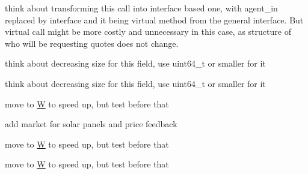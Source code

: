 \begin{DoxyRefList}
\item[\label{_dev_stage2__DevStage2000021}%
\hypertarget{_dev_stage2__DevStage2000021}{}%
Member \hyperlink{classsolar__core_1_1_s_e_i_ad532ca9d30d5988e051b75e33ce6c241}{solar\+\_\+core\+:\+:S\+E\+I\+:\+:form\+\_\+online\+\_\+quote} (std\+::shared\+\_\+ptr$<$ P\+V\+Project $>$ project\+\_\+)]think about transforming this call into interface based one, with agent\+\_\+in replaced by interface and it being virtual method from the general interface. But virtual call might be more costly and unnecessary in this case, as structure of who will be requesting quotes does not change.  
\item[\label{_dev_stage2__DevStage2000019}%
\hypertarget{_dev_stage2__DevStage2000019}{}%
Member \hyperlink{classsolar__core_1_1_s_e_i_a5fc331197d08788392c3af1903f25763}{solar\+\_\+core\+:\+:S\+E\+I\+:\+:location\+\_\+y} ]think about decreasing size for this field, use uint64\+\_\+t or smaller for it  
\item[\label{_dev_stage2__DevStage2000020}%
\hypertarget{_dev_stage2__DevStage2000020}{}%
Member \hyperlink{classsolar__core_1_1_s_e_i_ad5326c45ccd4a5512a6c0a296656264d}{solar\+\_\+core\+:\+:S\+E\+I\+:\+:mes\+\_\+marketing} ]think about decreasing size for this field, use uint64\+\_\+t or smaller for it  
\item[\label{_dev_stage2__DevStage2000014}%
\hypertarget{_dev_stage2__DevStage2000014}{}%
Member \hyperlink{classsolar__core_1_1_s_e_i_af885d50c89decf5b6ff208c24cedd82b}{solar\+\_\+core\+:\+:S\+E\+I\+:\+:S\+E\+I} (const Property\+Tree \&pt\+\_\+, \hyperlink{classsolar__core_1_1_w}{W} $\ast$w\+\_\+)]move to \hyperlink{classsolar__core_1_1_w}{W} to speed up, but test before that  
\item[\label{_dev_stage2__DevStage2000023}%
\hypertarget{_dev_stage2__DevStage2000023}{}%
Class \hyperlink{classsolar__core_1_1_s_e_m}{solar\+\_\+core\+:\+:S\+E\+M} ]add market for solar panels and price feedback  
\item[\label{_dev_stage2__DevStage2000022}%
\hypertarget{_dev_stage2__DevStage2000022}{}%
Member \hyperlink{classsolar__core_1_1_s_e_m_a60d13fcadec26853d8461d32eefb97da}{solar\+\_\+core\+:\+:S\+E\+M\+:\+:S\+E\+M} (const Property\+Tree \&pt\+\_\+, \hyperlink{classsolar__core_1_1_w}{W} $\ast$w\+\_\+)]move to \hyperlink{classsolar__core_1_1_w}{W} to speed up, but test before that  
\item[\label{_dev_stage2__DevStage2000024}%
\hypertarget{_dev_stage2__DevStage2000024}{}%
Member \hyperlink{classsolar__core_1_1_utility_aa52a4877b6281d4ffa8f003b831e802c}{solar\+\_\+core\+:\+:Utility\+:\+:Utility} (const Property\+Tree \&pt\+\_\+, \hyperlink{classsolar__core_1_1_w}{W} $\ast$w\+\_\+)]move to \hyperlink{classsolar__core_1_1_w}{W} to speed up, but test before that  

\end{DoxyRefList}
